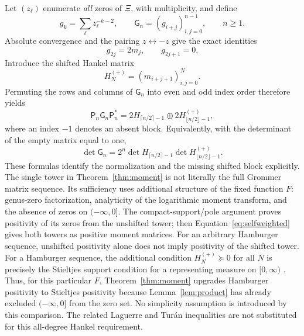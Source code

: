\documentclass[11pt,letterpaper]{article}
\numberwithin{equation}{section}
\theoremstyle{definition}
\theoremstyle{remark}
\begin{document}
Let $(z_\ell)$ enumerate \emph{all} zeros of $\Xi$, with multiplicity, and define
\begin{equation}
 g_k=\sum_\ell z_\ell^{-k-2},\qquad
 \mathsf G_n=(g_{i+j})_{i,j=0}^{n-1},\qquad n\geq1.
 \label{eq:grommermoments}
\end{equation}
Absolute convergence and the pairing $z\leftrightarrow-z$ give the exact identities
\begin{equation}
 g_{2j}=2m_j,\qquad g_{2j+1}=0.
 \label{eq:grommerparity}
\end{equation}
Introduce the shifted Hankel matrix
\begin{equation}
 H_N^{(+)}=(m_{i+j+1})_{i,j=0}^{N}.
 \label{eq:shiftedhankel}
\end{equation}
Permuting the rows and columns of $\mathsf G_n$ into even and odd index order therefore yields
\begin{equation}
 \mathsf P_n\mathsf G_n\mathsf P_n^{*}
 =2H_{\lceil n/2\rceil-1}\oplus2H_{\lfloor n/2\rfloor-1}^{(+)},
 \label{eq:grommerblocks}
\end{equation}
where an index $-1$ denotes an absent block. Equivalently, with the determinant of the empty matrix equal to one,
\begin{equation}
 \det\mathsf G_n
 =2^n\det H_{\lceil n/2\rceil-1}
       \det H_{\lfloor n/2\rfloor-1}^{(+)}.
 \label{eq:grommerdeterminants}
\end{equation}
These formulas identify the normalization and the missing shifted block explicitly. The single tower in Theorem~\ref{thm:moment} is not literally the full Grommer matrix sequence. Its sufficiency uses additional structure of the fixed function $F$: genus-zero factorization, analyticity of the logarithmic moment transform, and the absence of zeros on $(-\infty,0]$. The compact-support/pole argument proves positivity of its zeros from the unshifted tower; then Equation~\eqref{eq:selfweighted} gives both towers as positive moment matrices. For an arbitrary Hamburger sequence, unshifted positivity alone does not imply positivity of the shifted tower. For a Hamburger sequence, the additional condition $H_N^{(+)}\succeq0$ for all $N$ is precisely the Stieltjes support condition for a representing measure on $[0,\infty)$ \cite{schmudgen}. Thus, for this particular $F$, Theorem~\ref{thm:moment} upgrades Hamburger positivity to Stieltjes positivity because Lemma~\ref{lem:product} has already excluded $(-\infty,0]$ from the zero set. No simplicity assumption is introduced by this comparison. The related Laguerre and Tur\'an inequalities \cite{cravencsordas} are not substituted for this all-degree Hankel requirement.
\end{document}
